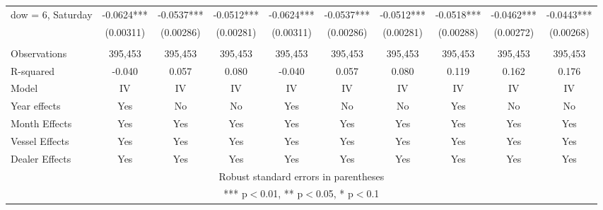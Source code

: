 \begin{tabular}{lccccccccc}
dow = 6, Saturday & -0.0624*** & -0.0537*** & -0.0512*** & -0.0624*** & -0.0537*** & -0.0512*** & -0.0518*** & -0.0462*** & -0.0443*** \\
 & (0.00311) & (0.00286) & (0.00281) & (0.00311) & (0.00286) & (0.00281) & (0.00288) & (0.00272) & (0.00268) \\
 &  &  &  &  &  &  &  &  &  \\
Observations & 395,453 & 395,453 & 395,453 & 395,453 & 395,453 & 395,453 & 395,453 & 395,453 & 395,453 \\
R-squared & -0.040 & 0.057 & 0.080 & -0.040 & 0.057 & 0.080 & 0.119 & 0.162 & 0.176 \\
Model & IV & IV & IV & IV & IV & IV & IV & IV & IV \\
Year effects & Yes & No & No & Yes & No & No & Yes & No & No \\
Month Effects & Yes & Yes & Yes & Yes & Yes & Yes & Yes & Yes & Yes \\
Vessel Effects & Yes & Yes & Yes & Yes & Yes & Yes & Yes & Yes & Yes \\
 Dealer Effects & Yes & Yes & Yes & Yes & Yes & Yes & Yes & Yes & Yes \\ \hline
\multicolumn{10}{c}{ Robust standard errors in parentheses} \\
\multicolumn{10}{c}{ *** p$<$0.01, ** p$<$0.05, * p$<$0.1} \\
\end{tabular}
